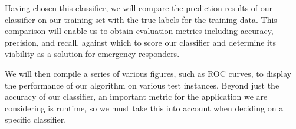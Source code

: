 \documentclass{article}
\begin{document}
Having chosen this classifier, we will compare the prediction results of our classifier on our training set with the true labels for the training data. This comparison will enable us to obtain evaluation metrics including accuracy, precision, and recall, against which to score our classifier and determine its viability as a solution for emergency responders.

We will then compile a series of various figures, such as ROC curves, to display the performance of our algorithm on various test instances. Beyond just the accuracy of our classifier, an important metric for the application we are considering is runtime, so we must take this into account when deciding on a specific classifier.




\end{document}
